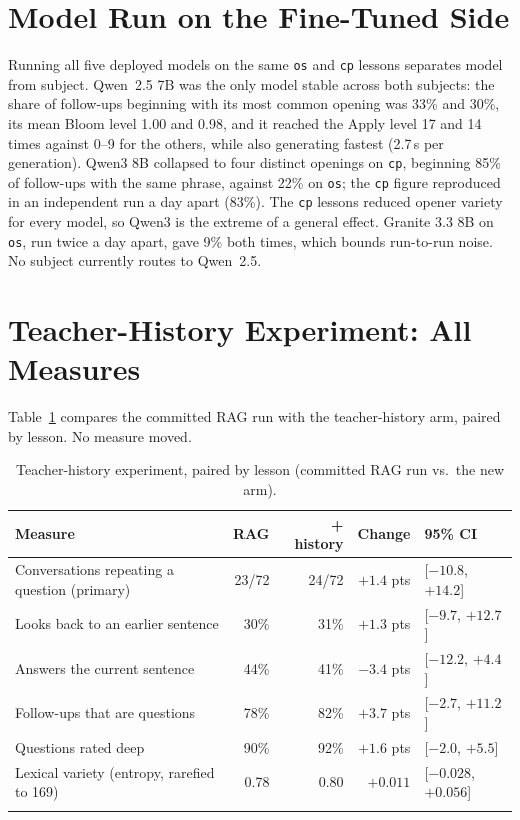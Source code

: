 \documentclass[pdflatex,sn-mathphys-num]{sn-jnl}%
\theoremstyle{thmstyleone}%
\theoremstyle{thmstyletwo}%
\theoremstyle{thmstylethree}%
\begin{document}
\begin{appendices}
\section{Model Run on the Fine-Tuned Side}\label{app:models}

Running all five deployed models on the same \texttt{os} and \texttt{cp} lessons separates model from
subject. Qwen~2.5 7B was the only model stable across both subjects: the share of follow-ups beginning
with its most common opening was 33\% and 30\%, its mean Bloom level 1.00 and 0.98, and it reached the
Apply level 17 and 14 times against 0--9 for the others, while also generating fastest (2.7\,s per
generation). Qwen3 8B collapsed to four distinct openings on \texttt{cp}, beginning 85\% of follow-ups
with the same phrase, against 22\% on \texttt{os}; the \texttt{cp} figure reproduced in an independent
run a day apart (83\%). The \texttt{cp} lessons reduced opener variety for every model, so Qwen3 is
the extreme of a general effect. Granite 3.3 8B on \texttt{os}, run twice a day apart, gave 9\% both
times, which bounds run-to-run noise. No subject currently routes to Qwen~2.5.

\section{Teacher-History Experiment: All Measures}\label{app:experiment}

Table~\ref{tab:experiment} compares the committed RAG run with the teacher-history arm, paired by lesson. No measure moved.

\begin{table}[h]
\caption{Teacher-history experiment, paired by lesson (committed RAG run vs.\ the new arm).}\label{tab:experiment}
\footnotesize
\begin{tabular*}{\textwidth}{@{\extracolsep\fill}lrrrl}
\toprule
Measure & RAG & + history & Change & 95\% CI \\
\midrule
Conversations repeating a question (primary) & 23/72 & 24/72 & $+1.4$ pts & [$-10.8$, $+14.2$] \\
Looks back to an earlier sentence & 30\% & 31\% & $+1.3$ pts & [$-9.7$, $+12.7$] \\
Answers the current sentence & 44\% & 41\% & $-3.4$ pts & [$-12.2$, $+4.4$] \\
Follow-ups that are questions & 78\% & 82\% & $+3.7$ pts & [$-2.7$, $+11.2$] \\
Questions rated deep & 90\% & 92\% & $+1.6$ pts & [$-2.0$, $+5.5$] \\
Lexical variety (entropy, rarefied to 169) & 0.78 & 0.80 & $+0.011$ & [$-0.028$, $+0.056$] \\
\botrule
\end{tabular*}
\end{table}


\end{appendices}
\end{document}
